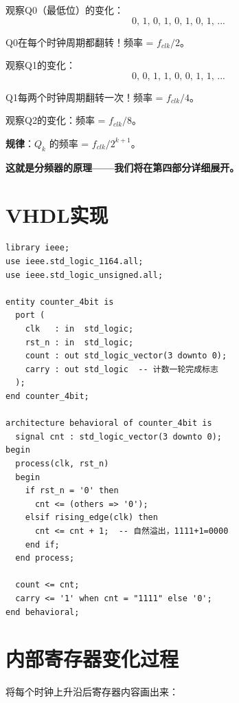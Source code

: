 观察Q0（最低位）的变化：
$$\text{0, 1, 0, 1, 0, 1, 0, 1, ...}$$

Q0在每个时钟周期都翻转！频率 = $f_{clk} / 2$。

观察Q1的变化：
$$\text{0, 0, 1, 1, 0, 0, 1, 1, ...}$$

Q1每两个时钟周期翻转一次！频率 = $f_{clk} / 4$。

观察Q2的变化：频率 = $f_{clk} / 8$。

\textbf{规律}：$Q_k$ 的频率 = $f_{clk} / 2^{k+1}$。

\textbf{这就是分频器的原理——我们将在第四部分详细展开。}

\section{VHDL实现}

\begin{lstlisting}[caption={4位二进制计数器（模16）}]
library ieee;
use ieee.std_logic_1164.all;
use ieee.std_logic_unsigned.all;

entity counter_4bit is
  port (
    clk   : in  std_logic;
    rst_n : in  std_logic;
    count : out std_logic_vector(3 downto 0);
    carry : out std_logic  -- 计数一轮完成标志
  );
end counter_4bit;

architecture behavioral of counter_4bit is
  signal cnt : std_logic_vector(3 downto 0);
begin
  process(clk, rst_n)
  begin
    if rst_n = '0' then
      cnt <= (others => '0');
    elsif rising_edge(clk) then
      cnt <= cnt + 1;  -- 自然溢出，1111+1=0000
    end if;
  end process;

  count <= cnt;
  carry <= '1' when cnt = "1111" else '0';
end behavioral;
\end{lstlisting}

\section{内部寄存器变化过程}

将每个时钟上升沿后寄存器内容画出来：

